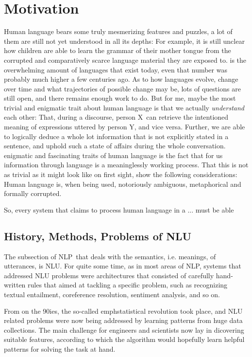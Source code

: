 
\label{chap:1_intro}
\section{Motivation}

Human language bears some truly mesmerizing features and puzzles, a lot of them are still not
yet understood in all its depths: For example, it is still unclear how children are able to
learn the grammar of their mother tongue from the corrupted and comparatively scarce language
material they are exposed to. %
is the overwhelming amount of languages that exist today, even that number was probably much
higher a few centuries ago.  As to how languages evolve, change over time and what trajectories
of possible change may be, lots of questions are still open, and there remains enough work
to do.  But for me, maybe the most trivial and enigmatic trait about human language is that
we actually \emph{understand} each other: That, during a discourse, person X can retrieve
the intentioned meaning of expressions uttered by person Y, and vice versa.  Further, we are
able to logically deduce a whole lot information that is not explicitly stated in a sentence,
and uphold such a state of affairs during the whole conversation.  %
enigmatic and fascinating traits of human language is the fact that for us %
information through language is a meaninglessly working process.  That this is not as trivial
as it might look like on first sight, show the following considerations: Human language is,
when being used, notoriously ambiguous, metaphorical and formally corrupted.

So, every system that claims to process human language in a ... must be able

\subsection{History, Methods, Problems of NLU}

The subsection of NLP that deals with the semantics, i.e. meanings, of utterances, is NLU.
For quite some time, as in most areas of NLP, systems that addressed NLU problems were
architectures that consisted of carefully hand-written rules that aimed at tackling a specific
problem, such as recognizing textual entailment, coreference resolution, sentiment analysis,
and so on.

From on the 90ies, the so-called emph{statistical revolution} took place, and NLU related
problems were now being addressed by learning patterns from huge data collections.  The main
challenge for engineers and scientists now lay in dicovering suitable features, according to
which the algorithm would hopefully learn helpful patterns for solving the task at hand.

